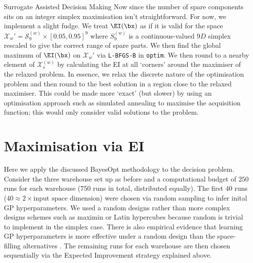 \begin{chapter}{Surrogate Assisted Decision Making \label{Chap:optimisation}}
Now since the number of spare components sits on an integer simplex maximisation isn't straightforward. For now, we implement a slight fudge. We treat $\EI(\bx)$ as if it is valid for the space $\mathcal{X}_{w}' = \mathcal{S}^{(w)}_9 \times [0.05,0.95]^9$ where $S^{(w)}_9$ is a continuous-valued $9D$ simplex rescaled to give the correct range of spare parts. We then find the global maximum of $\EI(\bx)$ on $\mathcal{X}_{w}'$ via \verb|L-BFGS-B| in \verb|optim|. We then round to a nearby element of $\mathcal{X}_s^{(w)}$ by calculating the EI at all `corners' around the maximiser of the relaxed problem. In essence, we relax the discrete nature of the optimisation problem and then round to the best solution in a region close to the relaxed maximiser. This could be made more `exact' (but slower) by using an optimisation approach such as simulated annealing to maximise the acquisition function; this would only consider valid solutions to the problem.


\section{Maximisation via EI}

Here we apply the discussed BayesOpt methodology to the decision problem. Consider the three warehouse set up as before and a computational budget of $250$ runs for each warehouse ($750$ runs in total, distributed equally). The first $40$ runs ($40 \approx 2 \times \text{input space dimension}$) were chosen via random sampling to infer inital GP hyperparameters. We used a random designs rather than more complex designs schemes such as maximin or Latin hypercubes because random is trivial to implement in the simplex case. There is also empirical evidence that learning GP hyperparameters is more effective under a random design than the space-filling alternatives \citep{Zhang2019}. The remaining runs for each warehouse are then chosen sequentially via the Expected Improvement strategy explained above.


\end{chapter}
